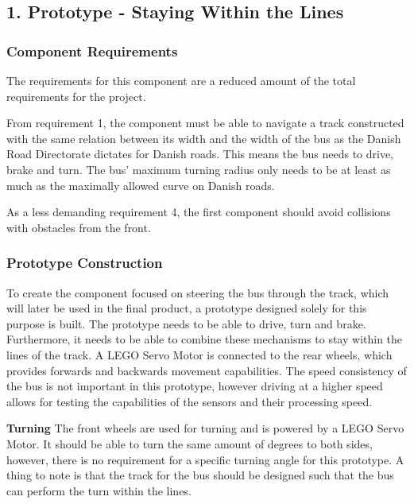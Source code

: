 \subsection{1. Prototype - Staying Within the Lines}

\subsubsection{Component Requirements}
The requirements for this component are a reduced amount of the total requirements for the project.

From requirement 1, the component must be able to navigate a track constructed with the same relation between its width and the width of the bus as the Danish Road Directorate dictates for Danish roads. This means the bus needs to drive, brake and turn. The bus' maximum turning radius only needs to be at least as much as the maximally allowed curve on Danish roads. 

As a less demanding requirement 4, the first component should avoid collisions with obstacles from the front. 

\subsubsection{Prototype Construction}
To create the component focused on steering the bus through the track, which will later be used in the final product, a prototype designed solely for this purpose is built. The prototype needs to be able to drive, turn and brake. Furthermore, it needs to be able to combine these mechanisms to stay within the lines of the track. A LEGO Servo Motor is connected to the rear wheels, which provides forwards and backwards movement capabilities. The speed consistency of the bus is not important in this prototype, however driving at a higher speed allows for testing the capabilities of the sensors and their processing speed.

\textbf{Turning}\newline
The front wheels are used for turning and is powered by a LEGO Servo Motor. It should be able to turn the same amount of degrees to both sides, however, there is no requirement for a specific turning angle for this prototype. A thing to note is that the track for the bus should be designed such that the bus can perform the turn within the lines.

